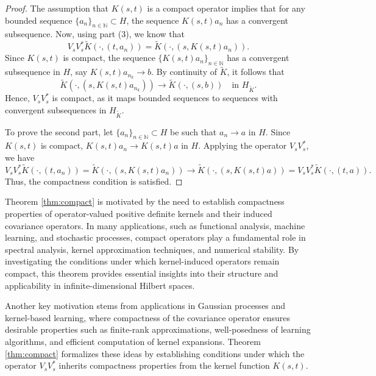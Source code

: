 \documentclass[11pt]{amsart}
\theoremstyle{definition}
\numberwithin{equation}{section}
\begin{document}
\begin{proof}
The assumption that \( K(s,t) \) is a compact operator implies that for any bounded sequence \( \{a_n\}_{n \in \mathbb{N}} \subset H \), the sequence \( K(s,t) a_n \) has a convergent subsequence. Now, using \cite[Theorem 3.1]{Jorgensen2024} part (3), we know that 
\[
V_s V_s^* \tilde{K}(\cdot, (t, a_n)) = \tilde{K}(\cdot, (s, K(s,t) a_n)).
\]
Since \( K(s,t) \) is compact, the sequence \( \{K(s,t) a_n\}_{n \in \mathbb{N}} \) has a convergent subsequence in \( H \), say \( K(s,t) a_{n_k} \to b \). By continuity of \( \tilde{K} \), it follows that 
\[
\tilde{K}(\cdot, (s, K(s,t) a_{n_k})) \to \tilde{K}(\cdot, (s, b)) \quad \text{in } H_{\tilde{K}}.
\]
Hence, \( V_s V_s^* \) is compact, as it maps bounded sequences to sequences with convergent subsequences in \( H_{\tilde{K}} \).

To prove the second part, let \( \{a_n\}_{n \in \mathbb{N}} \subset H \) be such that \( a_n \to a \) in \( H \). Since \( K(s,t) \) is compact, \( K(s,t) a_n \to K(s,t) a \) in \( H \). Applying the operator \( V_s V_s^* \), we have 
\[
V_s V_s^* \tilde{K}(\cdot, (t, a_n)) = \tilde{K}(\cdot, (s, K(s,t) a_n)) \to \tilde{K}(\cdot, (s, K(s,t) a)) = V_s V_s^* \tilde{K}(\cdot, (t, a)).
\]
Thus, the compactness condition is satisfied.
\end{proof}

Theorem \ref{thm:compact} is motivated by the need to establish compactness properties of operator-valued positive definite kernels and their induced covariance operators. In many applications, such as functional analysis, machine learning, and stochastic processes, compact operators play a fundamental role in spectral analysis, kernel approximation techniques, and numerical stability. By investigating the conditions under which kernel-induced operators remain compact, this theorem provides essential insights into their structure and applicability in infinite-dimensional Hilbert spaces.

Another key motivation stems from applications in Gaussian processes and kernel-based learning, where compactness of the covariance operator ensures desirable properties such as finite-rank approximations, well-posedness of learning algorithms, and efficient computation of kernel expansions. Theorem \ref{thm:compact} formalizes these ideas by establishing conditions under which the operator $V_sV_s^*$ inherits compactness properties from the kernel function $K(s, t)$.\\
\end{document}

